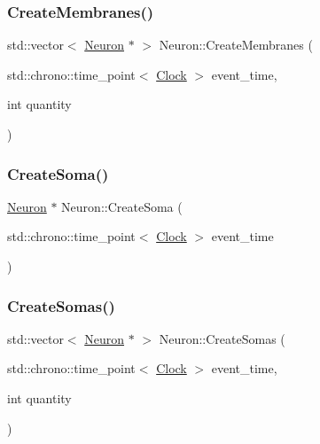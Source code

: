 \mbox{\label{classNeuron_a5f6f460c6a98319a05c3ba06d14e6f60}} 
\subsubsection{\texorpdfstring{Create\+Membranes()}{CreateMembranes()}}
{\footnotesize\ttfamily std\+::vector$<$ \mbox{\hyperlink{classNeuron}{Neuron}} $\ast$ $>$ Neuron\+::\+Create\+Membranes (\begin{DoxyParamCaption}\item[{std\+::chrono\+::time\+\_\+point$<$ \mbox{\hyperlink{universe_8h_a0ef8d951d1ca5ab3cfaf7ab4c7a6fd80}{Clock}} $>$}]{event\+\_\+time,  }\item[{int}]{quantity }\end{DoxyParamCaption})}

\mbox{\label{classNeuron_a32593a869b25c778c1856c36704f49cf}} 
\subsubsection{\texorpdfstring{Create\+Soma()}{CreateSoma()}}
{\footnotesize\ttfamily \mbox{\hyperlink{classNeuron}{Neuron}} $\ast$ Neuron\+::\+Create\+Soma (\begin{DoxyParamCaption}\item[{std\+::chrono\+::time\+\_\+point$<$ \mbox{\hyperlink{universe_8h_a0ef8d951d1ca5ab3cfaf7ab4c7a6fd80}{Clock}} $>$}]{event\+\_\+time }\end{DoxyParamCaption})}

\mbox{\label{classNeuron_a2016d83b02bfe9e5548d5c24ef31dded}} 
\subsubsection{\texorpdfstring{Create\+Somas()}{CreateSomas()}}
{\footnotesize\ttfamily std\+::vector$<$ \mbox{\hyperlink{classNeuron}{Neuron}} $\ast$ $>$ Neuron\+::\+Create\+Somas (\begin{DoxyParamCaption}\item[{std\+::chrono\+::time\+\_\+point$<$ \mbox{\hyperlink{universe_8h_a0ef8d951d1ca5ab3cfaf7ab4c7a6fd80}{Clock}} $>$}]{event\+\_\+time,  }\item[{int}]{quantity }\end{DoxyParamCaption})}

